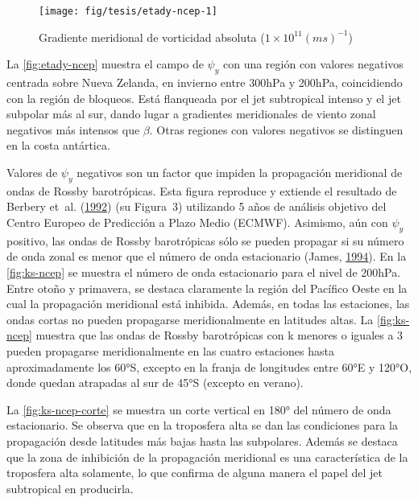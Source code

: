 \documentclass[spanish,a4paper,12pt,oneside]{book}
\begin{document}
\begin{landscape}\begin{figure}

{\centering \texttt{[image: fig/tesis/etady-ncep-1]} 

}

\caption{Gradiente meridional de vorticidad absoluta ($1\times10^11(ms)^{-1}$)}\label{fig:etady-ncep}
\end{figure}
\end{landscape}

La \autoref{fig:etady-ncep} muestra el campo de \(\psi_y\) con una
región con valores negativos centrada sobre Nueva Zelanda, en invierno
entre 300hPa y 200hPa, coincidiendo con la región de bloqueos. Está
flanqueada por el jet subtropical intenso y el jet subpolar más al sur,
dando lugar a gradientes meridionales de viento zonal negativos más
intensos que \(\beta\). Otras regiones con valores negativos se
distinguen en la costa antártica.

Valores de \(\psi_y\) negativos son un factor que impiden la propagación
meridional de ondas de Rossby barotrópicas. Esta figura reproduce y
extiende el resultado de Berbery et~al.
(\protect\hyperlink{ref-Berbery1992}{1992}) (su Figura~3) utilizando 5
años de análisis objetivo del Centro Europeo de Predicción a Plazo Medio
(ECMWF). Asimismo, aún con \(\psi_y\) positivo, las ondas de Rossby
barotrópicas sólo se pueden propagar si su número de onda zonal es menor
que el número de onda estacionario (James,
\protect\hyperlink{ref-James}{1994}). En la \autoref{fig:ks-ncep} se
muestra el número de onda estacionario para el nivel de 200hPa. Entre
otoño y primavera, se destaca claramente la región del Pacífico Oeste en
la cual la propagación meridional está inhibida. Además, en todas las
estaciones, las ondas cortas no pueden propagarse meridionalmente en
latitudes altas. La \autoref{fig:ks-ncep} muestra que las ondas de
Rossby barotrópicas con k menores o iguales a 3 pueden propagarse
meridionalmente en las cuatro estaciones hasta aproximadamente los 60°S,
excepto en la franja de longitudes entre 60°E y 120°O, donde quedan
atrapadas al sur de 45°S (excepto en verano).

La \autoref{fig:ks-ncep-corte} se muestra un corte vertical en 180° del
número de onda estacionario. Se observa que en la troposfera alta se dan
las condiciones para la propagación desde latitudes más bajas hasta las
subpolares. Además se destaca que la zona de inhibición de la
propagación meridional es una característica de la troposfera alta
solamente, lo que confirma de alguna manera el papel del jet subtropical
en producirla.
\end{document}
